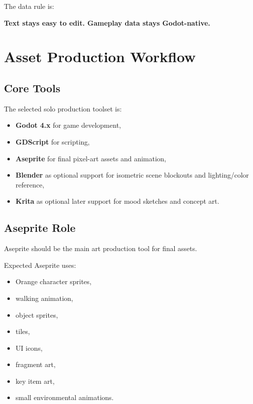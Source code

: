 \documentclass[12pt]{article}
\begin{document}
The data rule is:

\begin{center}
\textbf{Text stays easy to edit. Gameplay data stays Godot-native.}
\end{center}

\section{Asset Production Workflow}

\subsection{Core Tools}

The selected solo production toolset is:

\begin{itemize}[leftmargin=*]
    \item \textbf{Godot 4.x} for game development,
    \item \textbf{GDScript} for scripting,
    \item \textbf{Aseprite} for final pixel-art assets and animation,
    \item \textbf{Blender} as optional support for isometric scene blockouts and lighting/color reference,
    \item \textbf{Krita} as optional later support for mood sketches and concept art.
\end{itemize}

\subsection{Aseprite Role}

Aseprite should be the main art production tool for final assets.

Expected Aseprite uses:

\begin{itemize}[leftmargin=*]
    \item Orange character sprites,
    \item walking animation,
    \item object sprites,
    \item tiles,
    \item UI icons,
    \item fragment art,
    \item key item art,
    \item small environmental animations.
\end{itemize}
\end{document}
